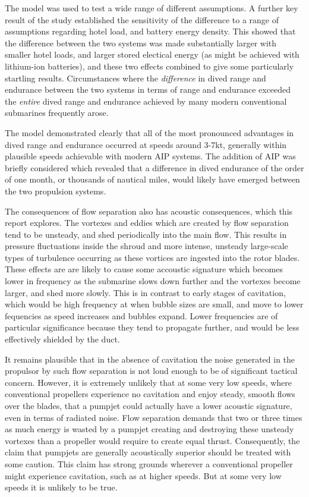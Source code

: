 \documentclass{article}\usepackage[]{graphicx}\usepackage[]{color}
\begin{document}
The model was used to test a wide range of different assumptions.  A further key result of the study established the sensitivity of the difference to a range of assumptions regarding hotel load, and battery energy density.  This showed that the difference between the two systems was made substantially larger with smaller hotel loads, and larger stored electical energy (as might be achieved with lithium-ion batteries), and these two effects combined to give some particularly startling results.  Circumstances where the \textit{difference} in dived range and endurance between the two systems in terms of range and endurance exceeded the \textit{entire} dived range and endurance achieved by many modern conventional submarines frequently arose.

The model demonstrated clearly that all of the most pronounced advantages in dived range and endurance occurred at speeds around 3-7kt, generally within plausible speeds achievable with modern AIP systems.  The addition of AIP was briefly considered which revealed that a difference in dived endurance of the order of one month, or thousands of nautical miles, would likely have emerged between the two propulsion systems.

The consequences of flow separation also has acoustic consequences, which this report explores.  The vortexes and eddies which are created by flow separation tend to be unsteady, and shed periodically into the main flow.  This results in pressure fluctuations inside the shroud and more intense, unsteady large-scale types of turbulence occurring as these vortices are ingested into the rotor blades.  These effects are are likely to cause some accoustic signature which becomes lower in frequency as the submarine slows down further and the vortexes become larger, and shed more slowly.  This is in contrast to early stages of cavitation, which would be high frequency at when bubble sizes are small, and move to lower fequencies as speed increases and bubbles expand.  Lower frequencies are of particular significance because they tend to propagate further, and would be less effectively shielded by the duct.

It remains plausible that in the absence of cavitation the noise generated in the propulsor by such flow separation is not loud enough to be of significant tactical concern. However, it is extremely unlikely that at some very low speeds, where conventional propellers experience no cavitation and enjoy steady, smooth flows over the blades, that a pumpjet could actually have a lower acoustic signature, even in terms of radiated noise.  Flow separation demands that two or three times as much energy is wasted by a pumpjet creating and destroying these unsteady vortexes than a propeller would require to create equal thrust. Consequently, the claim that pumpjets are generally acoustically superior should be treated with some caution.  This claim has strong grounds wherever a conventional propeller might experience cavitation, such as at higher speeds.  But at some very low speeds it is unlikely to be true.
\end{document}

